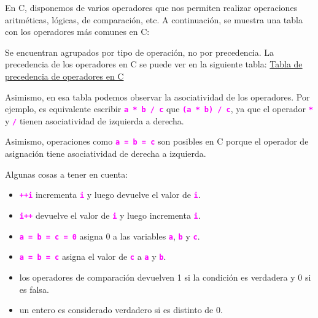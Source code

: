 \documentclass[]{scrartcl}
\newcommand{\hl}[1]{\textcolor{magenta}{\textbf{\texttt{#1}}}}
\begin{document}
En C, disponemos de varios operadores que nos permiten realizar operaciones aritméticas, lógicas, de comparación, etc. A continuación, se muestra una tabla con los operadores más comunes en C:

  \begin{table}[H]
    \centering
  \end{table}

Se encuentran agrupados por tipo de operación, no por precedencia. La precedencia de los operadores en C se puede ver en la siguiente tabla: \href{https://en.cppreference.com/w/c/language/operator_precedence}{Tabla de precedencia de operadores en C}

Asimismo, en esa tabla podemos observar la asociatividad de los operadores. Por ejemplo, es equivalente escribir \hl{a * b / c} que \hl{(a * b) / c}, ya que el operador \hl{*} y \hl{/} tienen asociatividad de izquierda a derecha.

Asimismo, operaciones como \hl{a = b = c} son posibles en C porque el operador de asignación tiene asociatividad de derecha a izquierda.

Algunas cosas a tener en cuenta:
\begin{itemize}
  \item \hl{++i} incrementa \hl{i} y luego devuelve el valor de \hl{i}.
  \item \hl{i++} devuelve el valor de \hl{i} y luego incrementa \hl{i}.
  \item \hl{a = b = c = 0} asigna 0 a las variables \hl{a}, \hl{b} y \hl{c}.
  \item \hl{a = b = c} asigna el valor de \hl{c} a \hl{a} y \hl{b}.
  \item los operadores de comparación devuelven 1 si la condición es verdadera y 0 si es falsa.
  \item un entero es considerado verdadero si es distinto de 0.
\end{itemize}
\end{document}
